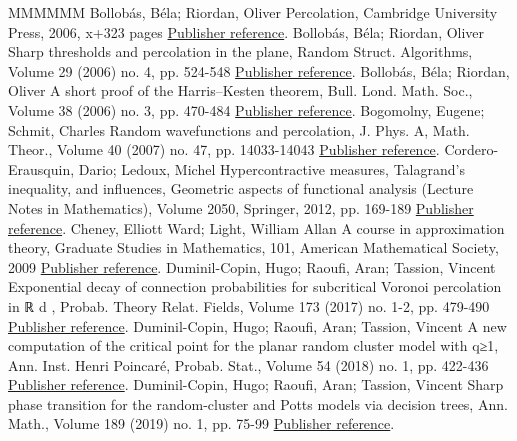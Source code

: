 \documentclass[11pt]{article}
\theoremstyle{definition}
\numberwithin{equation}{section}
\begin{document}
\begin{thebibliography}{MMMMMM}
 Bollobás, Béla; Riordan, Oliver Percolation, Cambridge University Press, 2006, x+323 pages \href{https://ahl.centre-mersenne.org/item/AHL_2020__3__169_0/#bollobas2006percolation}{Publisher reference}.
 Bollobás, Béla; Riordan, Oliver Sharp thresholds and percolation in the plane, Random Struct. Algorithms, Volume 29 (2006) no. 4, pp. 524-548 \href{https://ahl.centre-mersenne.org/item/AHL_2020__3__169_0/#bollobas2006sharp}{Publisher reference}.
 Bollobás, Béla; Riordan, Oliver A short proof of the Harris–Kesten theorem, Bull. Lond. Math. Soc., Volume 38 (2006) no. 3, pp. 470-484 \href{https://ahl.centre-mersenne.org/item/AHL_2020__3__169_0/#bollobas2006short}{Publisher reference}.
 Bogomolny, Eugene; Schmit, Charles Random wavefunctions and percolation, J. Phys. A, Math. Theor., Volume 40 (2007) no. 47, pp. 14033-14043 \href{https://ahl.centre-mersenne.org/item/AHL_2020__3__169_0/#bs_07}{Publisher reference}.
 Cordero-Erausquin, Dario; Ledoux, Michel Hypercontractive measures, Talagrand’s inequality, and influences, Geometric aspects of functional analysis (Lecture Notes in Mathematics), Volume 2050, Springer, 2012, pp. 169-189 \href{https://ahl.centre-mersenne.org/item/AHL_2020__3__169_0/#cordero2012hypercontractive}{Publisher reference}.
 Cheney, Elliott Ward; Light, William Allan A course in approximation theory, Graduate Studies in Mathematics, 101, American Mathematical Society, 2009 \href{https://ahl.centre-mersenne.org/item/AHL_2020__3__169_0/#cheney2009course}{Publisher reference}.
 Duminil-Copin, Hugo; Raoufi, Aran; Tassion, Vincent Exponential decay of connection probabilities for subcritical Voronoi percolation in ℝ d , Probab. Theory Relat. Fields, Volume 173 (2017) no. 1-2, pp. 479-490 \href{https://ahl.centre-mersenne.org/item/AHL_2020__3__169_0/#duminil2017exponential}{Publisher reference}.
 Duminil-Copin, Hugo; Raoufi, Aran; Tassion, Vincent A new computation of the critical point for the planar random cluster model with q≥1, Ann. Inst. Henri Poincaré, Probab. Stat., Volume 54 (2018) no. 1, pp. 422-436 \href{https://ahl.centre-mersenne.org/item/AHL_2020__3__169_0/#duminil2016new}{Publisher reference}.
 Duminil-Copin, Hugo; Raoufi, Aran; Tassion, Vincent Sharp phase transition for the random-cluster and Potts models via decision trees, Ann. Math., Volume 189 (2019) no. 1, pp. 75-99 \href{https://ahl.centre-mersenne.org/item/AHL_2020__3__169_0/#duminil2017sharp}{Publisher reference}.

\end{thebibliography}
\end{document}
